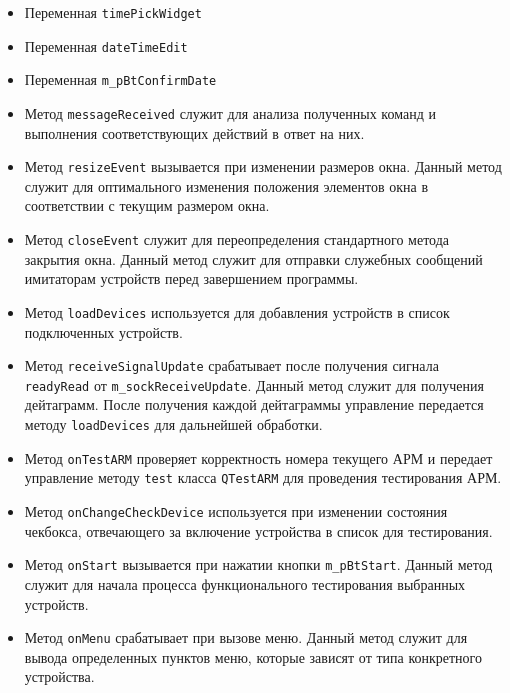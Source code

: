 \begin{itemize}
	\item Переменная \texttt{timePickWidget}
	\item Переменная \texttt{dateTimeEdit}
	\item Переменная \texttt{m\_pBtConfirmDate}

	\item Метод \texttt{messageReceived} служит для анализа полученных команд и выполнения соответствующих действий
		в ответ на них.

	\item Метод \texttt{resizeEvent} вызывается при изменении размеров окна. Данный метод служит для оптимального
		изменения положения элементов окна в соответствии с текущим размером окна.

	\item Метод \texttt{closeEvent} служит для переопределения стандартного метода закрытия окна. Данный метод
		служит для отправки служебных сообщений имитаторам устройств перед завершением программы.

	\item Метод \texttt{loadDevices} используется для добавления устройств в список подключенных устройств.

	\item Метод \texttt{receiveSignalUpdate} срабатывает после получения сигнала \texttt{readyRead} от
		\texttt{m\_sockReceiveUpdate}. Данный метод служит для получения дейтаграмм. После получения каждой
		дейтаграммы управление передается методу \texttt{loadDevices} для дальнейшей обработки.

	\item Метод \texttt{onTestARM} проверяет корректность номера текущего АРМ и передает управление методу
		\texttt{test} класса \texttt{QTestARM} для проведения тестирования АРМ.

	\item Метод \texttt{onChangeCheckDevice} используется при изменении состояния чекбокса, отвечающего за включение
		устройства в список для тестирования.

	\item Метод \texttt{onStart} вызывается при нажатии кнопки \texttt{m\_pBtStart}. Данный метод служит для начала
		процесса функционального тестирования выбранных устройств.

	\item Метод \texttt{onMenu} срабатывает при вызове меню. Данный метод служит для вывода определенных пунктов
		меню, которые зависят от типа конкретного устройства.


\end{itemize}
